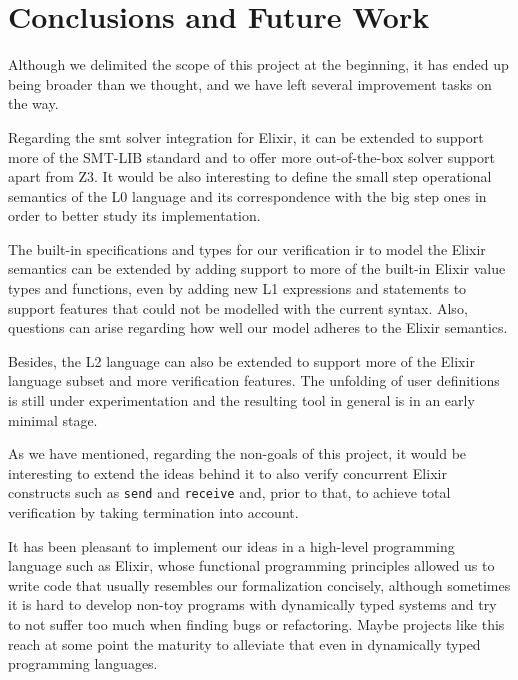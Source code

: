 \chapter{Conclusions and Future Work}
\label{cap:conclusions}


Although we delimited the scope of this project at the beginning, it has ended
up being broader than we thought, and we have left several improvement tasks on
the way.

Regarding the \acrshort{smt} solver integration for Elixir, it can be extended
to support more of the SMT-LIB standard and to offer more out-of-the-box solver 
support apart from Z3. It would be also interesting to define the small step 
operational semantics of the L0 language and its correspondence with the big
step ones in order to better study its implementation.

The built-in specifications and types for our verification \gls{ir} to model the
Elixir semantics can be extended by adding support to more of the built-in
Elixir value types and functions, even by adding new L1 expressions and
statements to support features that could not be modelled with the current
syntax. Also, questions can arise regarding how well our model adheres to the
Elixir semantics.

Besides, the L2 language can also be extended to support more of the Elixir
language subset and more verification features. The unfolding of user
definitions is still under experimentation and the resulting tool in general is
in an early minimal stage.

As we have mentioned, regarding the non-goals of this project, it would be
interesting to extend the ideas behind it to also verify concurrent Elixir
constructs such as \verb|send| and \verb|receive| and, prior to that, to achieve
total verification by taking termination into account.

It has been pleasant to implement our ideas in a high-level programming language
such as Elixir, whose functional programming principles allowed us to write code
that usually resembles our formalization concisely, although sometimes it is
hard to develop non-toy programs with dynamically typed systems and try to not 
suffer too much when finding bugs or refactoring. Maybe projects like this reach
at some point the maturity to alleviate that even in dynamically typed 
programming languages.
